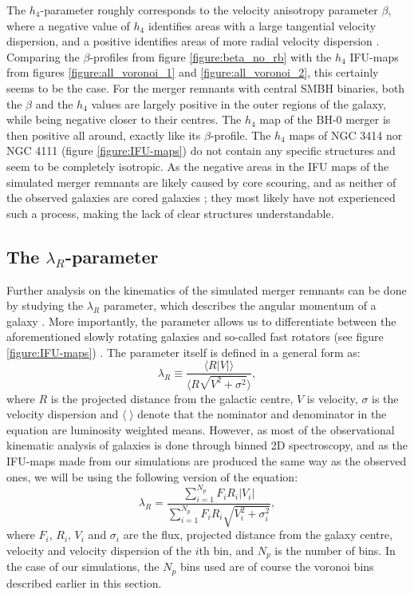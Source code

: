 \documentclass[english, oneside]{HYgradu}
\begin{document}
The $h_4$-parameter roughly corresponds to the velocity anisotropy parameter $\beta$, where a negative value of $h_4$ identifies areas with a large tangential velocity dispersion, and a positive identifies areas of more radial velocity dispersion \citep{Gerhard1993, Gerhard1998, Thomas2007}. Comparing the $\beta$-profiles from figure \ref{figure:beta_no_rb} with the $h_4$ IFU-maps from figures \ref{figure:all_voronoi_1} and \ref{figure:all_voronoi_2}, this certainly seems to be the case. For the merger remnants with central SMBH binaries, both the $\beta$ and the $h_4$ values are largely positive in the outer regions of the galaxy, while being negative closer to their centres. The $h_4$ map of the BH-0 merger is then positive all around, exactly like its $\beta$-profile. The $h_4$ maps of NGC 3414 nor NGC 4111 (figure \ref{figure:IFU-maps}) do not contain any specific structures and seem to be completely isotropic. As the negative areas in the IFU maps of the simulated merger remnants are likely caused by core scouring, and as neither of the observed galaxies are cored galaxies \citep{Lauer2007}; they most likely have not experienced such a process, making the lack of clear structures understandable.

\subsection{The $\lambda_R$-parameter}

Further analysis on the kinematics of the simulated merger remnants can be done by studying the $\lambda_R$ parameter, which describes the angular momentum of a galaxy \citep{Emsellem2007}. More importantly, the parameter allows us to differentiate between the aforementioned slowly rotating galaxies and so-called fast rotators (see figure \ref{figure:IFU-maps}) \citep{Emsellem2007}. The parameter itself is defined in a general form as:
\begin{equation}
\lambda_R \equiv \frac{\langle R |V| \rangle}{\langle R \sqrt{V^2 + \sigma^2} \rangle}, \label{eq:general_lambdar}
\end{equation}
where $R$ is the projected distance from the galactic centre, $V$ is velocity, $\sigma$ is the velocity dispersion and $\langle \; \rangle$ denote that the nominator and denominator in the equation are luminosity weighted means. However, as most of the observational kinematic analysis of galaxies is done through binned 2D spectroscopy, and as the IFU-maps made from our simulations are produced the same way as the observed ones, we will be using the following version of the equation:
\begin{equation}
\lambda_R = \frac{\sum^{N_p}_{i=1} F_i R_i |V_i|}{\sum^{N_p}_{i=1} F_i R_i \sqrt{V_i^2 + \sigma^2_i}}, \label{eq:binned_lambdar}
\end{equation}
where $F_i$, $R_i$, $V_i$ and $\sigma_i$ are the flux, projected distance from the galaxy centre, velocity and velocity dispersion of the $i$th bin, and $N_p$ is the number of bins. In the case of our simulations, the $N_p$ bins used are of course the voronoi bins described earlier in this section. 
\end{document}
